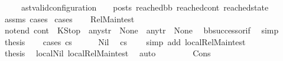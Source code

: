 \begin{isabellebody}
\ \ \ \ \ {\isachardoublequoteopen}{\isacharparenleft}{\kern0pt}ast{\isacharunderscore}{\kern0pt}valid{\isacharunderscore}{\kern0pt}configuration\ {\isasymLambda}\ {\isasymGamma}\ {\isasymOmega}\ posts\ reached{\isacharunderscore}{\kern0pt}bb\ reached{\isacharunderscore}{\kern0pt}cont\ reached{\isacharunderscore}{\kern0pt}state{\isacharparenright}{\kern0pt}{\isachardoublequoteclose}\ \isanewline
%
\isadelimproof
\ \ \ \ %
\endisadelimproof
%
\isatagproof
{}\isamarkupfalse%
\ assms\ cases\isanewline
{}\isamarkupfalse%
\ cases\isanewline
\ \ \isamarkupfalse%
\ Rel{\isacharunderscore}{\kern0pt}Main{\isacharunderscore}{\kern0pt}test\isanewline
\ \ \isamarkupfalse%
\ not{\isacharunderscore}{\kern0pt}end{\isacharcolon}{\kern0pt}\ {\isachardoublequoteopen}{\isacharparenleft}{\kern0pt}cont{}\ {\isasymnoteq}\ KStop{\isacharparenright}{\kern0pt}\ {\isasymor}\ any{\isacharunderscore}{\kern0pt}str\ {\isasymnoteq}\ None\ {\isasymor}\ any{\isacharunderscore}{\kern0pt}tr\ {\isasymnoteq}\ None{\isachardoublequoteclose}\ \isamarkupfalse%
\ bb{\isacharunderscore}{\kern0pt}successor{\isacharunderscore}{\kern0pt}if\ \isamarkupfalse%
\ simp\isanewline
\ \ \isamarkupfalse%
\ {\isacharquery}{\kern0pt}thesis\isanewline
\ \ \isamarkupfalse%
\ {\isacharparenleft}{\kern0pt}cases\ cs{}{\isacharparenright}{\kern0pt}\isanewline
\ \ \ \ \isamarkupfalse%
\ Nil\ \isamarkupfalse%
\ {\isacartoucheopen}cs{}\ {\isacharequal}{\kern0pt}\ {\isacharbrackleft}{\kern0pt}{\isacharbrackright}{\kern0pt}{\isacartoucheclose}\ \isamarkupfalse%
\ {\isacharparenleft}{\kern0pt}simp\ add{\isacharcolon}{\kern0pt}\ local{\isachardot}{\kern0pt}Rel{\isacharunderscore}{\kern0pt}Main{\isacharunderscore}{\kern0pt}test{\isacharparenleft}{\kern0pt}{}{\isacharparenright}{\kern0pt}{\isacharparenright}{\kern0pt}\ \isanewline
\ \ \ \ \isamarkupfalse%
\ {\isacharquery}{\kern0pt}thesis\ \isamarkupfalse%
\ local{\isachardot}{\kern0pt}Nil\ local{\isachardot}{\kern0pt}Rel{\isacharunderscore}{\kern0pt}Main{\isacharunderscore}{\kern0pt}test{\isacharparenleft}{\kern0pt}{}{\isacharparenright}{\kern0pt}\ \isamarkupfalse%
\ auto\isanewline
\ \ \isamarkupfalse%
\isanewline
\ \ \ \ \isamarkupfalse%
\ {\isacharparenleft}{\kern0pt}Cons{\isacharparenright}{\kern0pt}\ \isanewline

\end{isabellebody}
